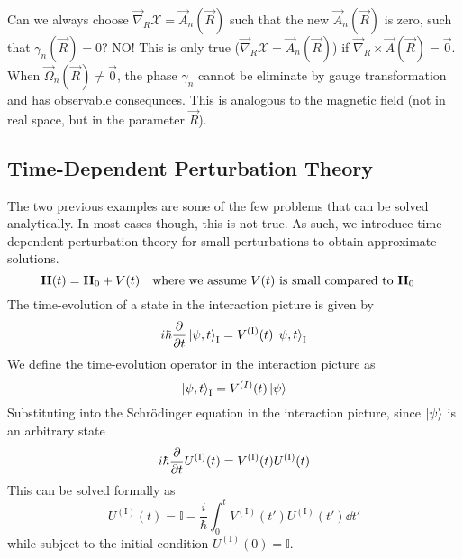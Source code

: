 \documentclass[12pt,a4paper,titlepage]{article}
\newcommand{\trm}[1]{\textrm{#1}} %
\newcommand{\Chi}{\mathcal{X}} %
\begin{document}
Can we always choose $\vec{\nabla}_{R}\Chi=\vec{A}_{n}(\vec{R})$ such that the new $\vec{A}_{n}(\vec{R})$ is zero, such that $\gamma_{n}(\vec{R})=0$? NO! This is only true ($\vec{\nabla}_{R}\Chi=\vec{A}_{n}(\vec{R})$) if $\vec{\nabla}_{R}\times\vec{A}(\vec{R})=\vec{0}$. When $\vec{\Omega}_{n}(\vec{R})\neq\vec{0}$, the phase $\gamma_{n}$ cannot be eliminate by gauge transformation and has observable consequnces. This is analogous to the magnetic field (not in real space, but in the parameter $\vec{R}$).

\subsection{Time-Dependent Perturbation Theory}
The two previous examples are some of the few problems that can be solved analytically. In most cases though, this is not true. As such, we introduce time-dependent perturbation theory for small perturbations to obtain approximate solutions.
\begin{equation}
\vb{H}(t)=\vb{H}_{0}+V(t)\qq{where we assume $V(t)$ is small compared to $\vb{H}_{0}$}
\end{equation}
The time-evolution of a state in the interaction picture is given by
\begin{equation}
i\hbar\pdv{t}\ket{\psi,t}_{\trm{I}}=V^{(\trm{I})}(t)\ket{\psi,t}_{\trm{I}}
\end{equation}
We define the time-evolution operator in the interaction picture as
\begin{equation}
\ket{\psi,t}_{\trm{I}}=V^{(I)}(t)\ket{\psi}
\end{equation}
Substituting into the Schr\"{o}dinger equation in the interaction picture, since $\ket{\psi}$ is an arbitrary state
\begin{equation}
i\hbar\pdv{t}U^{(\trm{I})}(t)=V^{(\trm{I})}(t)U^{(\trm{I})}(t)
\end{equation}
This can be solved formally as
\begin{equation}
U^{(\trm{I})}(t)=\mathbb{I}-\frac{i}{\hbar}\int_{0}^{t}V^{(\trm{I})}(t')U^{(\trm{I})}(t')\dd{t'}
\end{equation}
while subject to the initial condition $U^{(\trm{I})}(0)=\mathbb{I}$.\\
\end{document}
